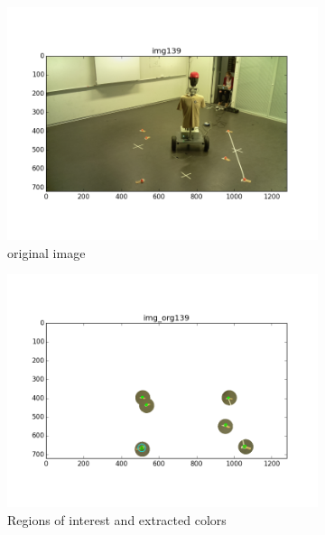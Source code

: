 \begin{figure}[H]
	\centering
	\begin{subfigure}[b]{0.49\linewidth}
        \centering
		\includegraphics[width=\linewidth]{files/_img139_cvt.png}
		\caption{original image}
		\label{fig:img}
	\end{subfigure}
	\begin{subfigure}[b]{0.49\linewidth}
        \centering
		\includegraphics[width=\linewidth]{files/_img_org139.png}
		\caption{Regions of interest and extracted colors}
		\label{fig:img_org}
	\end{subfigure}
	\begin{subfigure}[b]{0.49\linewidth}
        \centering

\end{subfigure}
\end{figure}
